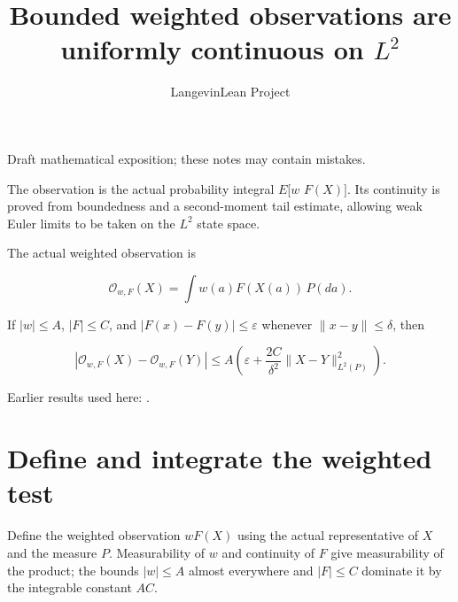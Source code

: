 \documentclass[11pt,a4paper]{article}
\title{\texorpdfstring{Bounded weighted observations are uniformly continuous on \(L^{2}\)}{Bounded weighted observations are uniformly continuous on L²}}
\author{LangevinLean Project}
\date{}
\begin{document}
\maketitle
Draft mathematical exposition; these notes may contain mistakes.


The observation is the actual probability integral \(E\)[\(w\) \(F(X)]\). Its continuity is proved from boundedness and a second-moment tail estimate, allowing weak Euler limits to be taken on the \(L^{2}\) state space.



The actual weighted observation is


\[\mathcal O_{w,F}(X)=\int w(a)F(X(a))\,P(da).\]


If \(|w|\le A\), \(|F|\le C\), and \(|F(x)-F(y)|\le\varepsilon\) whenever \(\|x-y\|\le\delta\), then


\[\left|\mathcal O_{w,F}(X)-\mathcal O_{w,F}(Y)\right|
\le A\left(\varepsilon+\frac{2C}{\delta^2}\|X-Y\|_{L^2(P)}^2\right).\]

Earlier results used here: \cite[Section~3.13]{LangevinLean2026ULASC}.

\section{\texorpdfstring{Define and integrate the weighted test}{Define and integrate the weighted test}}


Define the weighted observation \(wF(X)\) using the actual representative of \(X\) and the measure \(P\). Measurability of \(w\) and continuity of \(F\) give measurability of the product; the bounds \(|w|\le A\) almost everywhere and \(|F|\le C\) dominate it by the integrable constant \(AC\).
\end{document}
